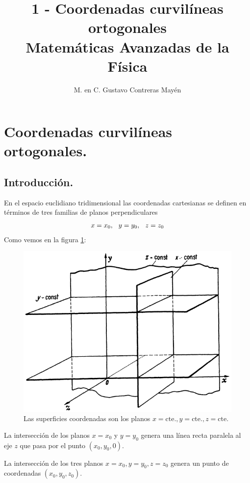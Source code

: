 
\usepackage{apacite}
\title{1 - Coordenadas curvilíneas ortogonales \\[0.3em]  \large{Matemáticas Avanzadas de la Física}\vspace{-3ex}}
\author{M. en C. Gustavo Contreras Mayén}
\date{ }

\vspace{-4cm}
\maketitle
\fontsize{14}{14}\selectfont
\tableofcontents
\newpage
\section{Coordenadas curvilíneas ortogonales.}

\subsection{Introducción.}

En el espacio euclidiano tridimensional las coordenadas cartesianas se definen en términos de tres familias de planos perpendiculares 
\begin{align*}
x = x_{0}, \hspace{0.25cm} y = y_{0}, \hspace{0.25cm} z = z_{0}
\end{align*}
Como vemos en la figura \ref{fig:figura_planos_cartesianos}:
\begin{figure}[H]
   \centering
   \includegraphics[scale=1.5]{Imagenes/Planos_Coordenadas_Cartesianas.png}
   \caption{Las superficies coordenadas son los planos $x=\mbox{cte.}, y=\mbox{cte.}, z=\mbox{cte.}$}
   \label{fig:figura_planos_cartesianos}
\end{figure}
La intersección de los planos $x = x_{0}$ y $y = y_{0}$ genera una línea recta paralela al eje $z$
que pasa por el punto $(x_{0}, y_{0}, 0)$.
\par
La intersección de los tres planos $x = x_{0}, y = y_{0}, z = z_{0}$ genera un punto de coordenadas $(x_{0}, y_{0}, z_{0})$.

